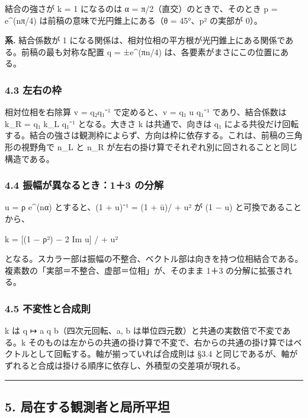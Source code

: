\documentclass[
  a4paper,
]{ltjsarticle}
\begin{document}
結合の強さが \textbar k\textbar{} = 1 になるのは α =
π/2（直交）のときで、そのとき p = e\^{}(nπ/4)
は前稿の意味で光円錐上にある（θ = 45°、p² の実部が 0）。

\textbf{系.} 結合係数が 1
になる関係は、相対位相の平方根が光円錐上にある関係である。前稿の最も対称な配置
q = ±e\^{}(πn/4) は、各要素がまさにこの位置にある。

\subsubsection{4.3 左右の枠}\label{ux5de6ux53f3ux306eux67a0}

相対位相を右除算 v = q₂q₁⁻¹ で定めると、v = q₁ u q₁⁻¹ であり、結合係数は
k\_R = q₁ k\_L q₁⁻¹ となる。大きさ \textbar k\textbar{} は共通で、向きは
q₁
による共役だけ回転する。結合の強さは観測枠によらず、方向は枠に依存する。これは、前稿の三角形の視野角で
n\_L と n\_R が左右の掛け算でそれぞれ別に回されることと同じ構造である。

\subsubsection{4.4 振幅が異なるとき：1＋3
の分解}\label{ux632fux5e45ux304cux7570ux306aux308bux3068ux304d13-ux306eux5206ux89e3}

u = ρ e\^{}(nα) とすると、(1 + u)⁻¹ = (1 + ū)/ + u\textbar² が
(1 − u) と可換であることから、

k = {[}(1 − ρ²) − 2 Im u{]} /  + u\textbar²

となる。スカラー部は振幅の不整合、ベクトル部は向きを持つ位相結合である。複素数の「実部＝不整合、虚部＝位相」が、そのまま
1＋3 の分解に拡張される。

\subsubsection{4.5
不変性と合成則}\label{ux4e0dux5909ux6027ux3068ux5408ux6210ux5247}

\textbar k\textbar{} は q ↦ a q b（四次元回転、a, b
は単位四元数）と共通の実数倍で不変である。k
そのものは左からの共通の掛け算で不変で、右からの共通の掛け算ではベクトルとして回転する。軸が揃っていれば合成則は
§3.4
と同じであるが、軸がずれると合成は掛ける順序に依存し、外積型の交差項が現れる。

\begin{center}\rule{0.5\linewidth}{0.5pt}\end{center}

\subsection{5.
局在する観測者と局所平坦}\label{ux5c40ux5728ux3059ux308bux89b3ux6e2cux8005ux3068ux5c40ux6240ux5e73ux5766}
\end{document}
